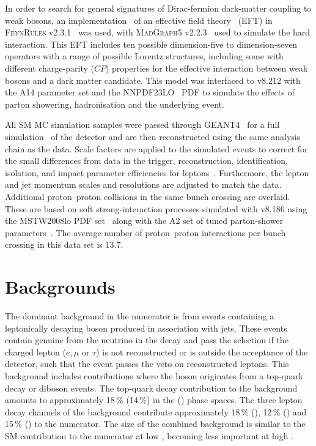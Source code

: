 \documentclass[cernpreprint,txfonts,UKenglish,texlive=2016]{\ATLASLATEXPATH atlasdoc}
\begin{document}
In order to search for general signatures of Dirac-fermion dark-matter coupling to weak bosons,
an implementation~\cite{Brooke:2016vlw} of an effective field theory~\cite{Cotta:2012nj} (EFT) 
in \textsc{FeynRules} v2.3.1~\cite{Alloul:2013bka} was used,
with \textsc{MadGraph5} v2.2.3~\cite{Alwall:2011uj} used to simulate
the hard interaction. This EFT includes ten possible dimension-five to dimension-seven operators
with a range of possible Lorentz structures, including some with different charge-parity ($CP$) properties for the
effective interaction between weak bosons and a dark matter candidate.
This model was interfaced to \pythia{} v8.212 
with the A14 parameter set and the NNPDF23LO~\cite{Ball:2012cx} PDF to simulate the effects
of parton showering, hadronisation and the underlying event.

All SM MC simulation samples were passed through \textsc{GEANT4}~\cite{geant-1,geant-2} 
for a full simulation~\cite{SOFT-2010-01} of the detector and are then reconstructed 
using the same analysis chain as the data.
Scale factors are applied to the simulated events to correct for the
small differences from data in the trigger, reconstruction,
identification, isolation, and impact parameter efficiencies for
leptons~\cite{PERF-2015-10,PERF-2016-01}. Furthermore, the
lepton and jet momentum scales and
resolutions are adjusted to match the data.
Additional proton--proton collisions in the same bunch crossing
 are overlaid. These are based on soft strong-interaction processes simulated
with \pythia{} v8.186 using the MSTW2008lo 
PDF set~\cite{Martin:2009iq} along with the A2 set of tuned parton-shower
parameters~\cite{ATL-PHYS-PUB-2011-014}.
The average number of proton--proton interactions per bunch crossing in this data set is 13.7.



\section{Backgrounds}
\label{sec:backgrounds}

The dominant background in the \ptmissjet{} numerator is from events
containing a leptonically decaying \W{} boson produced in association with
jets.
 These events contain genuine \ptmiss{} from the neutrino in the \W{}
decay and pass the selection if the charged lepton ($e, \mu$ or
$\tau$) is not reconstructed or is outside the acceptance of
the detector, such that the event passes the veto on reconstructed leptons.
This background
includes contributions where the \W{} boson originates from a top-quark decay or diboson
events. The top-quark decay contribution to the \W{} background amounts to approximately
18\,\% (14\,\%) in the \onejet{} (\vbf{}) phase spaces.
The three lepton decay channels of 
the \W{} background contribute approximately 18\,\% (\Wmunu), 12\,\% (\Wenu) 
and 15\,\% (\Wtaunu) to the numerator.
The size of the combined \W{} background is similar to the SM \Znunu{}
contribution to the numerator at low \ptmiss{}, becoming less
important at high \ptmiss{}. 
\end{document}
